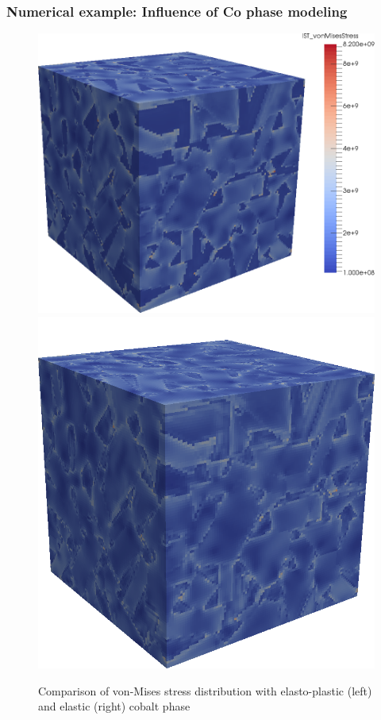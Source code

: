 \documentclass[11pt]{beamer} %
\begin{document}
\begin{frame}
 \frametitle{Numerical example: Influence of Co phase modeling}
 \begin{figure}[htbp!]
 \centering
  \includegraphics[scale=0.20]{rve_vonmises}
  \includegraphics[scale=0.20]{rve_vonmises_elastic}
 \caption{Comparison of von-Mises stress distribution with elasto-plastic (left) and elastic (right) cobalt phase} \label{fig:rve_stress}
\end{figure}
\end{frame}
\end{document}
